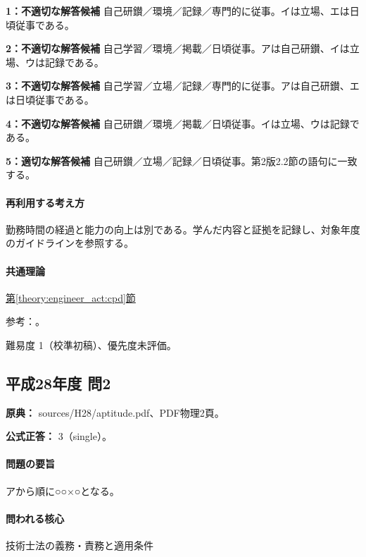 \noindent\textbf{1：不適切な解答候補} 自己研鑚／環境／記録／専門的に従事。イは立場、エは日頃従事である。\par

\noindent\textbf{2：不適切な解答候補} 自己学習／環境／掲載／日頃従事。アは自己研鑚、イは立場、ウは記録である。\par

\noindent\textbf{3：不適切な解答候補} 自己学習／立場／記録／専門的に従事。アは自己研鑚、エは日頃従事である。\par

\noindent\textbf{4：不適切な解答候補} 自己研鑚／環境／掲載／日頃従事。イは立場、ウは記録である。\par

\noindent\textbf{5：適切な解答候補} 自己研鑚／立場／記録／日頃従事。第2版2.2節の語句に一致する。\par

\paragraph{再利用する考え方} 勤務時間の経過と能力の向上は別である。学んだ内容と証拠を記録し、対象年度のガイドラインを参照する。

\paragraph{共通理論} \hyperref[theory:engineer_act:cpd]{第\ref*{theory:engineer_act:cpd}節}

\par 参考：\cite{cpd_v2}。

\par 難易度 1（校準初稿）、優先度未評価。

\subsection{平成28年度 問2}
\label{q:h28-reg-apt-02}

\noindent\textbf{原典：} sources/H28/aptitude.pdf、PDF物理2頁。

\textbf{公式正答：} 3（single）。

\paragraph{問題の要旨} アから順に○○×○となる。

\paragraph{問われる核心} 技術士法の義務・責務と適用条件

